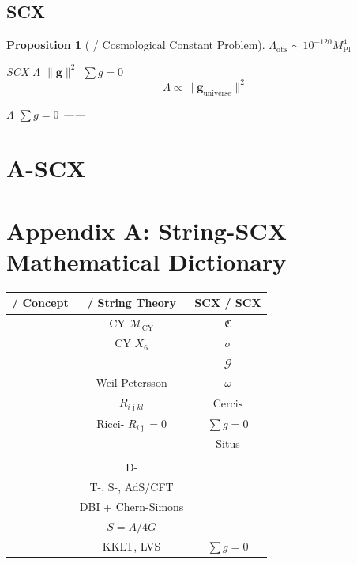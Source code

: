 \documentclass[12pt,a4paper]{article}
\theoremstyle{plain}
\newtheorem{proposition}[theorem]{ Proposition}
\theoremstyle{definition}
\newcommand{\Gauge}{\mathcal{G}}
\newcommand{\M}{\mathcal{M}}
\newcommand{\gv}{\mathbf{g}}
\newcommand{\conn}{\omega}
\newcommand{\sect}{\sigma}
\newcommand{\ClaimSpace}{\mathfrak{C}}
\DeclareMathOperator{\Cercis}{Cercis}
\begin{document}
\subsection{ SCX }

\begin{proposition}[ / Cosmological Constant Problem]
 $\Lambda_{\text{obs}} \sim 10^{-120} M_{\text{Pl}}^4$ 

 SCX $\Lambda$  $\|\gv\|^2$ $\sum g = 0$ 
\begin{equation}
    \Lambda \propto \|\gv_{\text{universe}}\|^2
\end{equation}

$\Lambda$  $\sum g = 0$ ——

\end{proposition}

\newpage


\section{A-SCX }
\section*{Appendix A: String-SCX Mathematical Dictionary}

\begin{center}
\renewcommand{\arraystretch}{1.5}
\begin{tabular}{c|c|c}
    \toprule
    \textbf{ / Concept} & \textbf{ / String Theory} & \textbf{SCX / SCX} \\
    \midrule
     & CY  $\M_{\text{CY}}$ &  $\ClaimSpace$ \\
     & CY  $X_6$ &  $\sect$ \\
     &  &  $\Gauge$ \\
     & Weil-Petersson  &  $\conn$ \\
     &  $R_{i\bar{\jmath} k\bar{l}}$ & $\Cercis$  \\
     & Ricci- $R_{i\bar{\jmath}} = 0$ & $\sum g = 0$ \\
     &  & Situs  \\
     &  &  \\
     & D- &  \\
     & T-, S-, AdS/CFT &  \\
     & DBI + Chern-Simons &  \\
     &  $S = A/4G$ &  \\
     & KKLT, LVS  & $\sum g = 0$  \\
    \bottomrule
\end{tabular}
\end{center}
\end{document}
